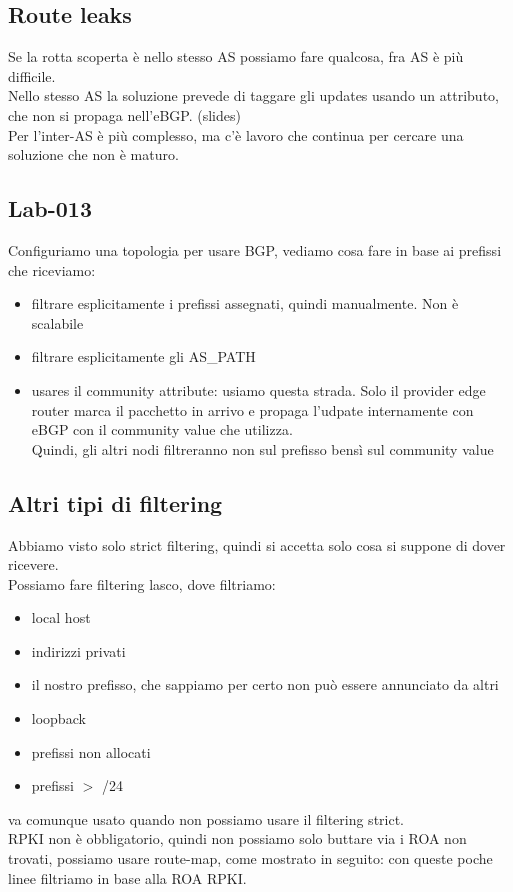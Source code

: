 \documentclass[12pt, oneside]{extbook} %
\begin{document}
\subsection{Route leaks}
Se la rotta scoperta è nello stesso AS possiamo fare qualcosa, fra AS è più difficile.\\Nello stesso AS la soluzione prevede di taggare gli updates usando un attributo, che non si propaga nell'eBGP. (slides)\\Per l'inter-AS è più complesso, ma c'è lavoro che continua per cercare una soluzione che non è maturo.
\subsection*{Lab-013}
Configuriamo una topologia per usare BGP, vediamo cosa fare in base ai prefissi che riceviamo:
\begin{itemize}
	\item filtrare esplicitamente i prefissi assegnati, quindi manualmente. Non è scalabile
	\item filtrare esplicitamente gli AS\_PATH
	\item usares il community attribute: usiamo questa strada. Solo il provider edge router marca il pacchetto in arrivo e propaga l'udpate internamente con eBGP con il community value che utilizza.\\Quindi, gli altri nodi filtreranno non sul prefisso bensì sul community value
\end{itemize}
\subsection{Altri tipi di filtering}
Abbiamo visto solo strict filtering, quindi si accetta solo cosa si suppone di dover ricevere.\\Possiamo fare filtering lasco, dove filtriamo:
\begin{itemize}
	\item local host
	\item indirizzi privati
	\item il nostro prefisso, che sappiamo per certo non può essere annunciato da altri
	\item loopback
	\item prefissi non allocati
	\item prefissi $>$ /24
\end{itemize}
va comunque usato quando non possiamo usare il filtering strict.\\RPKI non è obbligatorio, quindi non possiamo solo buttare via i ROA non trovati, possiamo usare route-map, come mostrato in seguito:
con queste poche linee filtriamo in base alla ROA RPKI.
\end{document}
